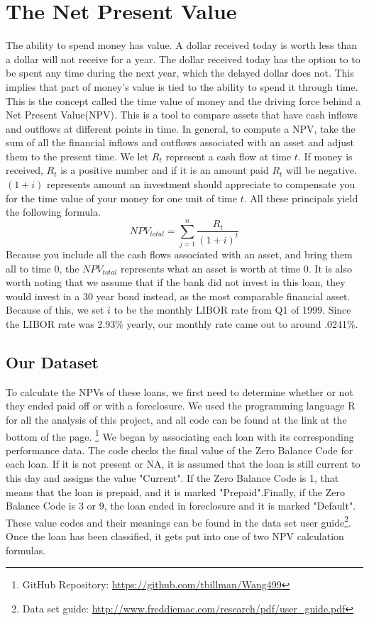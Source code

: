 \documentclass[12 pt]{uncw_thesis}
\theoremstyle{plain}
\theoremstyle{remark}
\theoremstyle{definition}
\begin{document}
\section{The Net Present Value}
The ability to spend money has value. A dollar received today is worth less than a dollar will not receive for a year. The dollar received today has the option to to be spent any time during the next year, which the delayed dollar does not. This implies that part of money's value is tied to the ability to spend it through time. This is the concept called the time value of money and the driving force behind a Net Present Value(NPV). This is a tool to compare assets that have cash inflows and outflows at different points in time. In general, to compute a NPV, take the sum of all the financial inflows and outflows associated with an asset and adjust them to the present time. We let \(R_t\) represent a cash flow at time \(t\). If money is received, \(R_t\) is a positive number and if it is an amount paid \(R_t\) will be negative. \((1+i)\) represents amount an investment should appreciate to compensate you for the time value of your money for one unit of time \(t\). All these principals yield the following formula. 
\[NPV_{total} = \sum_{j=1}^n \frac{R_t}{(1+i)^t}\]
Because you include all the cash flows associated with an asset, and bring them all to time 0, the \(NPV_{total}\) represents what an asset is worth at time 0. It is also worth noting that we assume that if the bank did not invest in this loan, they would invest in a 30 year bond instead, as the most comparable financial asset. Because of this, we set \(i\) to be the monthly LIBOR rate from Q1 of 1999. Since the LIBOR rate was 2.93\% yearly, our monthly rate came out to around .0241\%.
\subsection{Our Dataset}
To calculate the NPVs of these loans, we first need to determine whether or not they ended paid off or with a foreclosure. We used the programming language R for all the analysis of this project, and all code can be found at the link at the bottom of the page. \footnote{GitHub Repository: \href{https://github.com/tbillman/Wang499}{https://github.com/tbillman/Wang499}} We began by associating each loan with its corresponding performance data. The code checks the final value of the Zero Balance Code for each loan. If it is not present or NA, it is assumed that the loan is still current to this day and assigns the value "Current". If the Zero Balance Code is 1, that means that the loan is prepaid, and it is marked "Prepaid".Finally, if the Zero Balance Code is 3 or 9, the loan ended in foreclosure and it is marked "Default". These value codes and their meanings can be found in the data set user guide\footnote{Data set guide: \href{http://www.freddiemac.com/research/pdf/user\_guide.pdf}{http://www.freddiemac.com/research/pdf/user\_guide.pdf}}. Once the loan has been classified, it gets put into one of two NPV calculation formulas.
\end{document}
